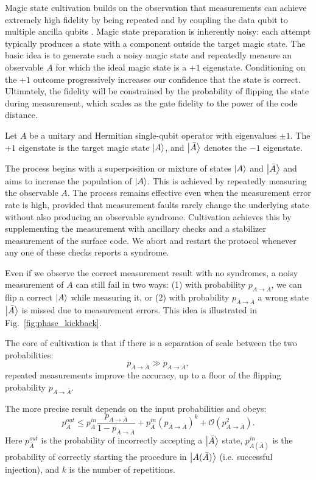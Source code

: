 \documentclass[twocolumn,notitlepage,nofootinbib,floatfix,superscriptaddress]{revtex4-1}
\begin{document}
Magic state cultivation builds on the observation that measurements can achieve extremely high fidelity by being repeated and by coupling the data qubit to multiple ancilla qubits \cite{shor1996fault}. Magic state preparation is inherently noisy: each attempt typically produces a state with a component outside the target magic state. The basic idea is to generate such a noisy magic state and repeatedly measure an observable $A$ for which the ideal magic state is a \(+1\) eigenstate. Conditioning on the \(+1\) outcome progressively increases our confidence that the state is correct. Ultimately, the fidelity will be constrained by the probability of flipping the state during measurement, which scales as the gate fidelity to the power of the code distance.   

Let \(A\) be a unitary and Hermitian single-qubit operator with eigenvalues \(\pm 1\). The \(+1\) eigenstate is the target magic state \(\ket{A}\), and \(\ket{\bar{A}}\) denotes the \(-1\) eigenstate. 

The process begins with a superposition or mixture of states $\ket{A}$ and $\ket{\bar{A}}$ and aims to increase the population of $\ket{A}$. This is achieved by repeatedly measuring the observable $A$. The process remains effective even when the measurement error rate is high, provided that measurement faults rarely change the underlying state without also producing an observable syndrome. Cultivation achieves this by supplementing the measurement with ancillary checks and a stabilizer measurement of the surface code. We abort and restart the protocol whenever any one of these checks reports a syndrome.

Even if we observe the correct measurement result with no syndromes, a noisy measurement of $A$ can still fail in two ways: (1) with probability $ p_{A\to \bar{A}}$, we can flip a correct $\ket{A}$ while measuring it, or (2) with probability $p_{\bar{A}\to \bar{A}}$ a wrong state $\ket{\bar{A}}$ is missed due to measurement errors.
This idea is illustrated in Fig.~\ref{fig:phase_kickback}.

The core of cultivation is that if there is a separation of scale between the two probabilities:
$$p_{\bar{A}\to \bar{A}} \gg p_{A\to \bar{A}},$$
repeated measurements improve the accuracy, up to a floor of the flipping probability $p_{A\to \bar{A}}$. 

The more precise result depends on the input probabilities and obeys:
$$
    p_{\overline{A}}^{out} \le  p_{A}^{in}\frac{p_{A\to\overline{A}}}{1-p_{\overline{A}\to\overline{A}}}+p_{\overline{A}}^{in}\left(p_{\overline{A}\to\overline{A}}\right)^{k} + \mathcal{O}(p^2_{A\to\overline{A}}). 
$$
Here $p_{\bar{A}}^{out}$ is the probability of incorrectly accepting a $\ket{\bar{A}}$ state, $p_{A(\bar{A})}^{in}$ is the probability of correctly starting the procedure in $\ket{A(\bar{A})}$ (i.e. successful injection), and $k$ is the number of repetitions. 
\end{document}
